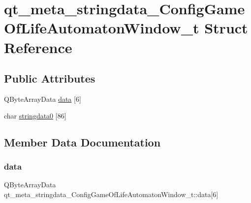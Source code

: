 \hypertarget{structqt__meta__stringdata___config_game_of_life_automaton_window__t}{}\section{qt\+\_\+meta\+\_\+stringdata\+\_\+\+Config\+Game\+Of\+Life\+Automaton\+Window\+\_\+t Struct Reference}
\label{structqt__meta__stringdata___config_game_of_life_automaton_window__t}
\subsection*{Public Attributes}
\begin{DoxyCompactItemize}
\item 
Q\+Byte\+Array\+Data \mbox{\hyperlink{structqt__meta__stringdata___config_game_of_life_automaton_window__t_a2413a6a9a29a9dc237ae821fcd252445}{data}} \mbox{[}6\mbox{]}
\item 
char \mbox{\hyperlink{structqt__meta__stringdata___config_game_of_life_automaton_window__t_a60ca54f2b367598e475ae7a68b8febac}{stringdata0}} \mbox{[}86\mbox{]}
\end{DoxyCompactItemize}


\subsection{Member Data Documentation}
\mbox{\label{structqt__meta__stringdata___config_game_of_life_automaton_window__t_a2413a6a9a29a9dc237ae821fcd252445}} 
\subsubsection{\texorpdfstring{data}{data}}
{\footnotesize\ttfamily Q\+Byte\+Array\+Data qt\+\_\+meta\+\_\+stringdata\+\_\+\+Config\+Game\+Of\+Life\+Automaton\+Window\+\_\+t\+::data\mbox{[}6\mbox{]}}

